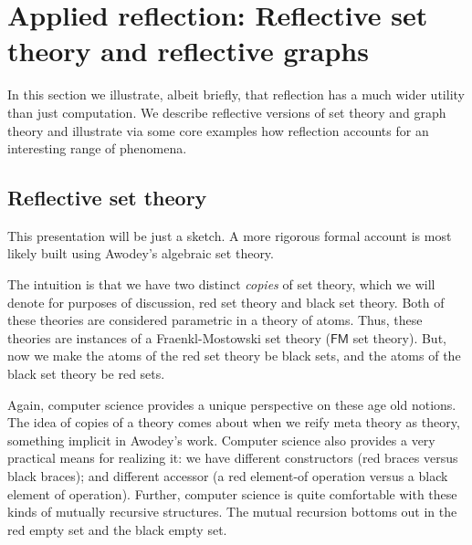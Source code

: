 \section{Applied reflection: Reflective set theory and reflective graphs}
In this section we illustrate, albeit briefly, that reflection has a
much wider utility than just computation. We describe reflective
versions of set theory and graph theory and illustrate via some core
examples how reflection accounts for an interesting range of phenomena.

\subsection{Reflective set theory}

This presentation will be just a sketch. A more rigorous formal
account is most likely built using Awodey's algebraic set theory.


The intuition is that we have two distinct \emph{copies} of set
theory, which we will denote for purposes of discussion, red set
theory and black set theory. Both of these theories are considered
parametric in a theory of atoms. Thus, these theories are instances of
a Fraenkl-Mostowski set theory ($\mathsf{FM}$ set theory). But, now we
make the atoms of the red set theory be black sets, and the atoms of
the black set theory be red sets.

Again, computer science provides a unique perspective on these age old
notions. The idea of copies of a theory comes about when we reify meta
theory as theory, something implicit in Awodey's work. Computer
science also provides a very practical means for realizing it: we have
different constructors (red braces versus black braces); and different
accessor (a red element-of operation versus a black element of
operation). Further, computer science is quite comfortable with these
kinds of mutually recursive structures. The mutual recursion bottoms
out in the red empty set and the black empty set.

